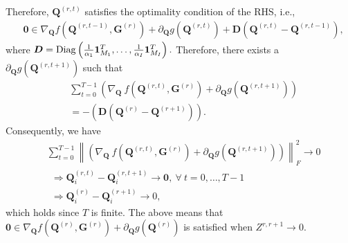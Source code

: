 \documentclass[10pt,journal]{IEEEtran}
\newcommand{\G}{\boldsymbol{G}}
\newcommand{\Q}{\boldsymbol{Q}}
\begin{document}
Therefore, $\Q^{(r,t)}$ satisfies the optimality condition of the RHS, i.e.,
\begin{align*}
&{\bm 0}\in \nabla_{\Q}f(\Q^{(r,t-1)},\G^{(r)}) + \partial_{\Q}g(\Q^{(r,t)})+{\bm D}(\Q^{(r,t)}-\Q^{(r,t-1)}),
\end{align*}
where
${\bm D}={\rm Diag}\left(\frac{1}{\alpha_1}{\bm 1}^T_{M_1},\ldots,\frac{1}{\alpha_I}{\bm 1}^T_{M_I}\right).$
Therefore, there exists a $\partial_{\Q} g\left(\Q^{(r,t+1)}\right)$ such that
\begin{equation} \label{eq:q_norm}
\begin{aligned}
&\sum_{t=0}^{T-1}\left(\nabla_{\Q}~f\left(\Q^{(r,t)},\G^{(r)}\right) + \partial_{\Q} g\left(\Q^{(r,t+1)}\right)\right) \\
&= -\left({\bm D}(\Q^{(r)}-\Q^{(r+1)})\right).
\end{aligned}
\end{equation}
Consequently, we have
\begin{align*}
&\sum_{t=0}^{T-1}\left\|\left(\nabla_{\Q}~f\left(\Q^{(r,t)},\G^{(r)}\right) + \partial_{\Q} g\left(\Q^{(r,t+1)}\right)\right) \right\|_F^2 \rightarrow 0 \nonumber\\
&~~\Rightarrow \Q_i^{(r,t)}-\Q_i^{(r,t+1)} \rightarrow {\bm 0},~\forall~t=0,\ldots,T-1\\
&~~\Rightarrow \Q_i^{(r)}-\Q_i^{(r+1)} \rightarrow 0,
\end{align*}
which holds since $T$ is finite.
The above means that 
${\bm 0}\in \nabla_{\Q}f(\Q^{(r)},\G^{(r)}) + \partial_{\Q}g(\Q^{(r)})$
is satisfied when $Z^{r,r+1}\rightarrow 0$.
\end{document}
